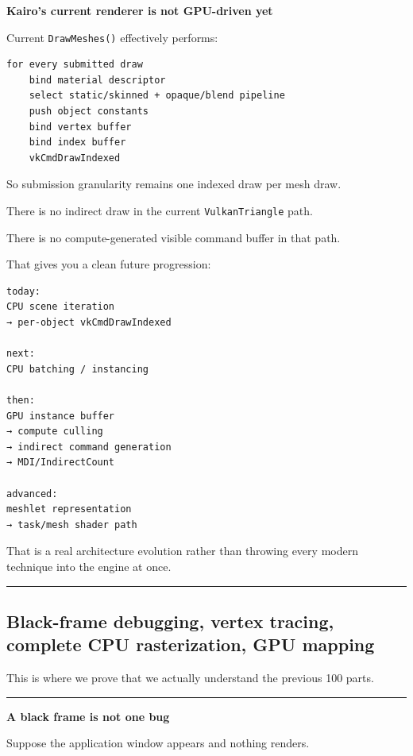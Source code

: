 \textbf{Kairo's current renderer is not GPU-driven yet}

Current \texttt{DrawMeshes()} effectively performs:

\begin{verbatim}
for every submitted draw
    bind material descriptor
    select static/skinned + opaque/blend pipeline
    push object constants
    bind vertex buffer
    bind index buffer
    vkCmdDrawIndexed
\end{verbatim}

So submission granularity remains one indexed draw per mesh draw.

There is no indirect draw in the current \texttt{VulkanTriangle} path.

There is no compute-generated visible command buffer in that path.

That gives you a clean future progression:

\begin{verbatim}
today:
CPU scene iteration
→ per-object vkCmdDrawIndexed

next:
CPU batching / instancing

then:
GPU instance buffer
→ compute culling
→ indirect command generation
→ MDI/IndirectCount

advanced:
meshlet representation
→ task/mesh shader path
\end{verbatim}

That is a real architecture evolution rather than throwing every modern technique into the engine at once.

\begin{center}\rule{0.5\linewidth}{0.5pt}\end{center}

\subsection{Black-frame debugging, vertex tracing, complete CPU rasterization, GPU mapping}\label{03-visual-computing-i-ch014-black-frame-debugging-vertex-tracing-complete-cpu-rasterization-gpu-mapping}

This is where we prove that we actually understand the previous 100 parts.

\begin{center}\rule{0.5\linewidth}{0.5pt}\end{center}

\textbf{A black frame is not one bug}

Suppose the application window appears and nothing renders.


